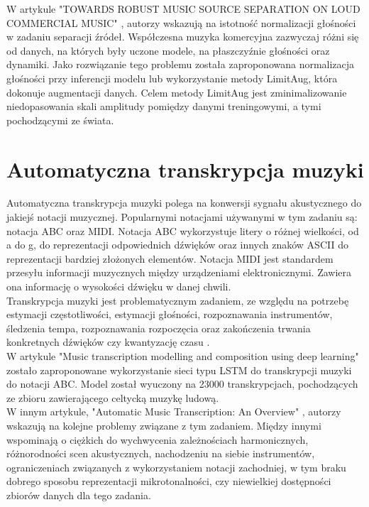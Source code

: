 \documentclass{article}
\begin{document}
W artykule "TOWARDS ROBUST MUSIC SOURCE SEPARATION ON LOUD COMMERCIAL MUSIC" \cite{jeon2022robust}, autorzy wskazują na istotność normalizacji głośności w zadaniu separacji źródeł. Współczesna muzyka komercyjna zazwyczaj różni się od danych, na których były uczone modele, na płaszczyźnie głośności oraz dynamiki. Jako rozwiązanie tego problemu została zaproponowana normalizacja głośności przy inferencji modelu lub wykorzystanie metody LimitAug, która dokonuje augmentacji danych. Celem metody LimitAug jest zminimalizowanie niedopasowania skali amplitudy pomiędzy danymi treningowymi, a tymi pochodzącymi ze świata. \\


\section{Automatyczna transkrypcja muzyki}
Automatyczna transkrypcja muzyki polega na konwersji sygnału akustycznego do jakiejś notacji muzycznej. Popularnymi notacjami używanymi w tym zadaniu są: notacja ABC oraz MIDI. Notacja ABC wykorzystuje litery o różnej wielkości, od a do g, do reprezentacji odpowiednich dźwięków oraz innych znaków ASCII do reprezentacji bardziej złożonych elementów. Notacja MIDI jest standardem przesyłu informacji muzycznych między urządzeniami elektronicznymi. Zawiera ona informację o wysokości dźwięku w danej chwili.\\


Transkrypcja muzyki jest problematycznym zadaniem, ze względu na potrzebę estymacji częstotliwości, estymacji głośności, rozpoznawania instrumentów, śledzenia tempa, rozpoznawania rozpoczęcia oraz zakończenia trwania konkretnych dźwięków czy kwantyzację czasu \cite{Benetos2013AutomaticMT}.\\


W artykule "Music transcription modelling and composition using deep learning" \cite{sturm2016music} zostało zaproponowane wykorzystanie sieci typu LSTM do transkrypcji muzyki do notacji ABC. Model został wyuczony na 23000 transkrypcjach, pochodzących ze zbioru zawierającego celtycką muzykę ludową.\\


W innym artykule, "Automatic Music Transcription: An Overview" \cite{Benetos2019AutomaticMT}, autorzy wskazują na kolejne problemy związane z tym zadaniem. Między innymi wspominają o ciężkich do wychwycenia zależnościach harmonicznych, różnorodności scen akustycznych, nachodzeniu na siebie instrumentów, ograniczeniach związanych z wykorzystaniem notacji zachodniej, w tym braku dobrego sposobu reprezentacji mikrotonalności, czy niewielkiej dostępności zbiorów danych dla tego zadania. \\
\end{document}
